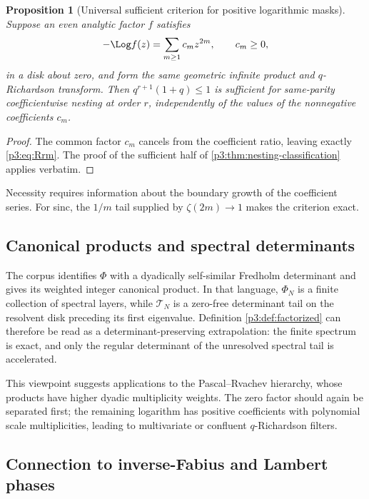 \documentclass[11pt]{article}
\numberwithin{equation}{section}
\newtheorem{proposition}[theorem]{Proposition}
\theoremstyle{definition}
\theoremstyle{remark}
\begin{document}
\begin{proposition}[Universal sufficient criterion for positive logarithmic masks]
\label{p3:prop:universal-mask}
Suppose an even analytic factor $f$ satisfies
\[
 -\Log f(z)=\sum_{m\ge1}c_mz^{2m},\qquad c_m\ge0,
\]
in a disk about zero, and form the same geometric infinite product and $q$-Richardson
transform.  Then $q^{r+1}(1+q)\le1$ is sufficient for same-parity coefficientwise nesting at
order $r$, independently of the values of the nonnegative coefficients $c_m$.
\end{proposition}

\begin{proof}
The common factor $c_m$ cancels from the coefficient ratio, leaving exactly
\eqref{p3:eq:Rrm}.  The proof of the sufficient half of
\cref{p3:thm:nesting-classification} applies verbatim.
\end{proof}

Necessity requires information about the boundary growth of the coefficient series.  For
sinc, the $1/m$ tail supplied by $\zeta(2m)\to1$ makes the criterion exact.

\subsection{Canonical products and spectral determinants}

The corpus identifies $\Phi$ with a dyadically self-similar Fredholm determinant and gives
its weighted integer canonical product.  In that language, $\Phi_N$ is a finite collection
of spectral layers, while $\mathcal T_N$ is a zero-free determinant tail on the resolvent
disk preceding its first eigenvalue.  Definition \ref{p3:def:factorized} can therefore be read
as a determinant-preserving extrapolation: the finite spectrum is exact, and only the
regular determinant of the unresolved spectral tail is accelerated.

This viewpoint suggests applications to the Pascal--Rvachev hierarchy, whose products have
higher dyadic multiplicity weights.  The zero factor should again be separated first; the
remaining logarithm has positive coefficients with polynomial scale multiplicities, leading
to multivariate or confluent $q$-Richardson filters.

\subsection{Connection to inverse-Fabius and Lambert phases}
\end{document}
